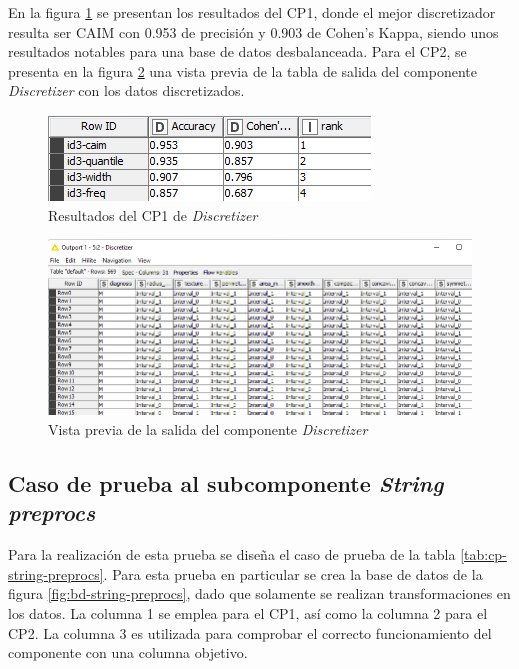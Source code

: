 En la figura \ref{fig:comparacion-disc} se presentan los resultados del CP1, donde el mejor discretizador resulta ser CAIM con 0.953 de precisión y 0.903 de Cohen's Kappa, siendo unos resultados notables para una base de datos desbalanceada. Para el CP2, se presenta en la figura \ref{fig:salida-discret} una vista previa de la tabla de salida del componente \textit{Discretizer} con los datos discretizados.

\begin{figure}[H]
	\centering
	\includegraphics[width=0.5\linewidth]{"figuras/capi 3/pruebas-jenn/comparacion-disc"}
	\caption{Resultados del CP1 de \textit{Discretizer}}
	\label{fig:comparacion-disc}
\end{figure}

\begin{figure}[H]
	\centering
	\includegraphics[width=0.8\linewidth]{"figuras/capi 3/pruebas-jenn/salida-discret"}
	\caption{Vista previa de la salida del componente \textit{Discretizer}}
	\label{fig:salida-discret}
\end{figure}



\subsection{Caso de prueba al subcomponente \textit{String preprocs}}

Para la realización de esta prueba se diseña el caso de prueba de la tabla \ref{tab:cp-string-preprocs}. Para esta prueba en particular se crea la base de datos de la figura \ref{fig:bd-string-preprocs}, dado que solamente se realizan transformaciones en los datos. La columna 1 se emplea para el CP1, así como la columna 2 para el CP2. La columna 3 es utilizada para comprobar el correcto funcionamiento del componente con una columna objetivo.

